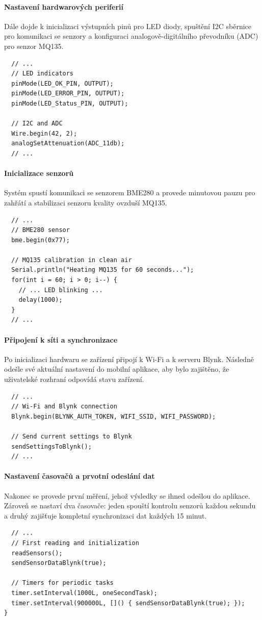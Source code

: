 \documentclass[12pt, twoside]{article} %
\begin{document}
\paragraph{Nastavení hardwarových periferií}
Dále dojde k inicializaci výstupních pinů pro LED diody, spuštění I2C sběrnice pro komunikaci se senzory a konfiguraci analogově-digitálního převodníku (ADC) pro senzor MQ135.
\begin{lstlisting}
  // ...
  // LED indicators
  pinMode(LED_OK_PIN, OUTPUT);
  pinMode(LED_ERROR_PIN, OUTPUT);
  pinMode(LED_Status_PIN, OUTPUT);

  // I2C and ADC
  Wire.begin(42, 2);
  analogSetAttenuation(ADC_11db);
  // ...
\end{lstlisting}

\paragraph{Inicializace senzorů}
Systém spustí komunikaci se senzorem BME280 a provede minutovou pauzu pro zahřátí a stabilizaci senzoru kvality ovzduší MQ135.
\begin{lstlisting}
  // ...
  // BME280 sensor
  bme.begin(0x77);

  // MQ135 calibration in clean air
  Serial.println("Heating MQ135 for 60 seconds...");
  for(int i = 60; i > 0; i--) {
    // ... LED blinking ...
    delay(1000);
  }
  // ...
\end{lstlisting}

\paragraph{Připojení k síti a synchronizace}
Po inicializaci hardwaru se zařízení připojí k Wi-Fi a k serveru Blynk. Následně odešle své aktuální nastavení do mobilní aplikace, aby bylo zajištěno, že uživatelské rozhraní odpovídá stavu zařízení.
\begin{lstlisting}
  // ...
  // Wi-Fi and Blynk connection
  Blynk.begin(BLYNK_AUTH_TOKEN, WIFI_SSID, WIFI_PASSWORD);

  // Send current settings to Blynk
  sendSettingsToBlynk();
  // ...
\end{lstlisting}

\paragraph{Nastavení časovačů a prvotní odeslání dat}
Nakonec se provede první měření, jehož výsledky se ihned odešlou do aplikace. Zároveň se nastaví dva časovače: jeden spouští kontrolu senzorů každou sekundu a druhý zajišťuje kompletní synchronizaci dat každých 15 minut.
\begin{lstlisting}
  // ...
  // First reading and initialization
  readSensors();
  sendSensorDataBlynk(true);

  // Timers for periodic tasks
  timer.setInterval(1000L, oneSecondTask);
  timer.setInterval(900000L, []() { sendSensorDataBlynk(true); });
}
\end{lstlisting}
\end{document}
